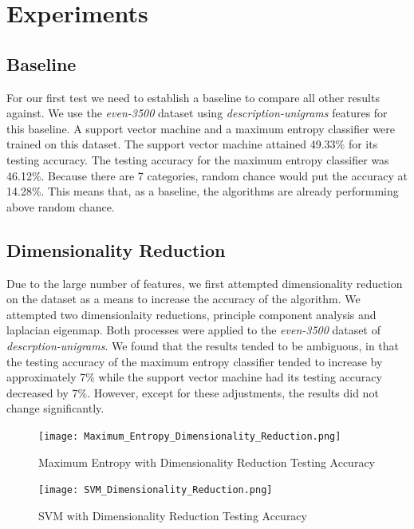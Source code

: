 \section{Experiments}
\subsection{Baseline}
For our first test we need to establish a baseline to compare all other results against.  We use the \emph{even-3500} dataset using  \emph{description-unigrams} features for this baseline.  A support vector machine and a maximum entropy classifier were trained on this dataset.  The support vector machine attained 49.33\% for its testing accuracy. The testing accuracy for the maximum entropy classifier was 46.12\%.  Because there are 7 categories, random chance would put the accuracy at 14.28\%.  This means that, as a baseline, the algorithms are already performming above random chance.

\subsection{Dimensionality Reduction}
Due to the large number of features, we first attempted dimensionality reduction on the dataset as a means to increase the accuracy of the algorithm.  We attempted two dimensionlaity reductions, principle component analysis and laplacian eigenmap. Both processes were applied to the \emph{even-3500} dataset of \emph{descrption-unigrams}.  We found that the results tended to be ambiguous, in that the testing accuracy of the maximum entropy classifier tended to increase by approximately 7\% while the support vector machine had its testing accuracy decreased by 7\%.  However, except for these adjustments, the results did not change significantly.
\\

\begin{figure}[!h]
\begin{center}
\caption{Maximum Entropy with Dimensionality Reduction Testing Accuracy}
\texttt{[image: Maximum\_Entropy\_Dimensionality\_Reduction.png]}
\end{center}
\end{figure}

\begin{figure}[!h]
\begin{center}
\caption{SVM with Dimensionality Reduction Testing Accuracy}
\texttt{[image: SVM\_Dimensionality\_Reduction.png]}
\end{center}
\end{figure}

